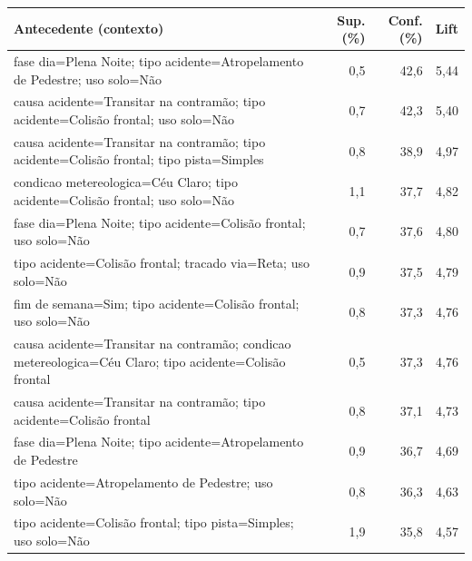 \begin{tabular}{@{}p{6.8cm}rrr@{}}
\toprule
\textbf{Antecedente (contexto)} & \textbf{Sup. (\%)} & \textbf{Conf. (\%)} & \textbf{Lift} \\
\midrule
fase dia=Plena Noite; tipo acidente=Atropelamento de Pedestre; uso solo=Não & 0,5 & 42,6 & 5,44 \\
causa acidente=Transitar na contramão; tipo acidente=Colisão frontal; uso solo=Não & 0,7 & 42,3 & 5,40 \\
causa acidente=Transitar na contramão; tipo acidente=Colisão frontal; tipo pista=Simples & 0,8 & 38,9 & 4,97 \\
condicao metereologica=Céu Claro; tipo acidente=Colisão frontal; uso solo=Não & 1,1 & 37,7 & 4,82 \\
fase dia=Plena Noite; tipo acidente=Colisão frontal; uso solo=Não & 0,7 & 37,6 & 4,80 \\
tipo acidente=Colisão frontal; tracado via=Reta; uso solo=Não & 0,9 & 37,5 & 4,79 \\
fim de semana=Sim; tipo acidente=Colisão frontal; uso solo=Não & 0,8 & 37,3 & 4,76 \\
causa acidente=Transitar na contramão; condicao metereologica=Céu Claro; tipo acidente=Colisão frontal & 0,5 & 37,3 & 4,76 \\
causa acidente=Transitar na contramão; tipo acidente=Colisão frontal & 0,8 & 37,1 & 4,73 \\
fase dia=Plena Noite; tipo acidente=Atropelamento de Pedestre & 0,9 & 36,7 & 4,69 \\
tipo acidente=Atropelamento de Pedestre; uso solo=Não & 0,8 & 36,3 & 4,63 \\
tipo acidente=Colisão frontal; tipo pista=Simples; uso solo=Não & 1,9 & 35,8 & 4,57 \\
\bottomrule
\end{tabular}